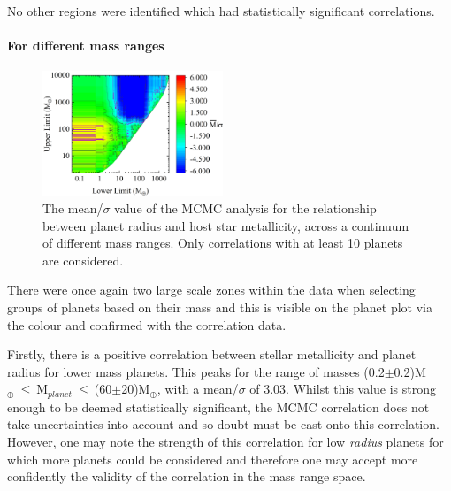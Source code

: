 \documentclass[a4paper,twocolumn,12pt]{article}
\begin{document}

No other regions were identified which had statistically significant correlations.




\paragraph{For different mass ranges}
\begin{figure}[h!]
    \centering
    \includegraphics[width=0.48\textwidth]{Graphs/FeH vs Radius correlations - Mass ranges.png}
    \caption{The mean/$\sigma$ value of the MCMC analysis for the relationship between planet radius and host star metallicity, across a continuum of different mass ranges. Only correlations with at least 10 planets are considered.}
    \label{figure: Fe/H vs Radius correlations - Mass ranges}
\end{figure}

There were once again two large scale zones within the data when selecting groups of planets based on their mass and this is visible on the planet plot via the colour and confirmed with the correlation data.

Firstly, there is a positive correlation between stellar metallicity and planet radius for lower mass planets. This peaks for the range of masses (0.2$\pm$0.2)M$_{\oplus}~\leq~$M$_{planet}~\leq~$(60$\pm$20)M$_{\oplus}$, with a mean/$\sigma$ of 3.03. Whilst this value is strong enough to be deemed statistically significant, the MCMC correlation does not take uncertainties into account and so doubt must be cast onto this correlation. However, one may note the strength of this correlation for low \textit{radius} planets for which more planets could be considered and therefore one may accept more confidently the validity of the correlation in the mass range space.
\end{document}
